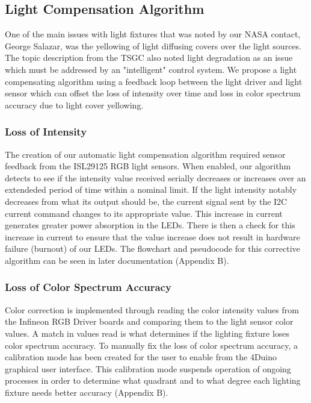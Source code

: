 \documentclass[12pt,a4paper]{report}
\begin{document}
\subsection{Light Compensation Algorithm}
One of the main issues with light fixtures that was noted by our NASA contact, George Salazar, was the yellowing of light diffusing covers over the light sources. The topic description from the TSGC also noted light degradation as an issue which must be addressed by an "intelligent" control system. We propose a light compensating algorithm using a feedback loop between the light driver and light sensor which can offset the loss of intensity over time and loss in color spectrum accuracy due to light cover yellowing.\\

\subsubsection{Loss of Intensity}
The creation of our automatic light compensation algorithm required sensor feedback from the ISL29125 RGB light sensors. When enabled, our algorithm detects to see if the intensity value received serially decreases or increases over an extendeded period of time within a nominal limit. If the light intensity notably decreases from what its output should be, the current signal sent by the I2C current command changes to its appropriate value. This increase in current generates greater power absorption in the LEDs. There is then a check for this increase in current to ensure that the value increase does not result in hardware failure (burnout) of our LEDs. The flowchart and pseudocode for this corrective algorithm can be seen in later documentation (Appendix B). \\

\subsubsection{Loss of Color Spectrum Accuracy}
Color correction is implemented through reading the color intensity values from the Infineon RGB Driver boards and comparing them to the light sensor color values. A match in values read is what determines if the lighting fixture loses color spectrum accuracy. To manually fix the loss of color spectrum accuracy, a calibration mode has been created for the user to enable from the 4Duino graphical user interface. This calibration mode suspends operation of ongoing processes in order to determine what quadrant and to what degree each lighting fixture needs better accuracy (Appendix B). \\
\end{document}
